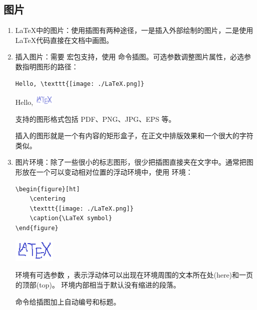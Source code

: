 \subsection{图片}

\begin{enumerate}

\item \LaTeX 中的图片：使用插图有两种途径，一是插入外部绘制的图片，二是使用 \LaTeX 代码直接在文档中画图。

\item 插入图片：需要  宏包支持，使用  命令插图。可选参数调整图片属性，必选参数指明图形的路径：


支持的图形格式包括 PDF、PNG、JPG、EPS 等。

插入的图形就是一个有内容的矩形盒子，在正文中排版效果和一个很大的字符类似。

\item 图片环境：除了一些很小的标志图形，很少把插图直接夹在文字中。通常把图形放在一个可以变动相对位置的浮动环境中，使用  环境：

\begin{tcolorbox}[sidebyside]
\begin{lstlisting}
\begin{figure}[ht]
    \centering
    \texttt{[image: ./LaTeX.png]}
    \caption{\LaTeX symbol}
\end{figure}
\end{lstlisting} 

\tcblower

    \centering
    \includegraphics[width=2cm]{./resource/graph/LaTeX.png}\vspace{-10pt}
\end{tcolorbox}

 环境有可选参数 \boxforcmd{[ht]} ，表示浮动体可以出现在环境周围的文本所在处(here)和一页的顶部(top)。 环境内部相当于默认没有缩进的段落。

\boxforcmd{\\caption} 命令给插图加上自动编号和标题。%


\end{enumerate}
